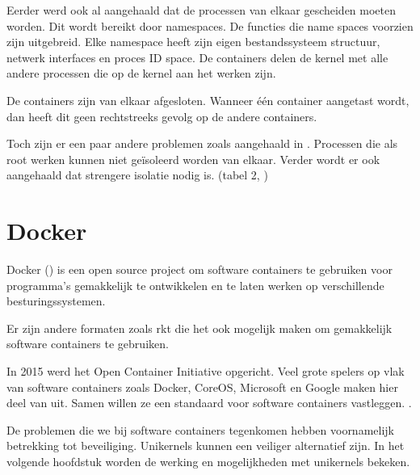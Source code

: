 Eerder werd ook al aangehaald dat de processen van elkaar gescheiden moeten worden. Dit wordt bereikt door namespaces. De functies die name spaces voorzien zijn uitgebreid. Elke namespace heeft zijn eigen bestandssysteem structuur, netwerk interfaces en proces ID space. De containers delen de kernel met alle andere processen die op de kernel aan het werken zijn.

De containers zijn van elkaar afgesloten. Wanneer één container aangetast wordt, dan heeft dit geen rechtstreeks gevolg op de andere containers.

Toch zijn er een paar andere problemen zoals aangehaald in \cite{madhavapeddy_jitsu:_2015}. Processen die als root werken kunnen niet geïsoleerd worden van elkaar. Verder wordt er ook aangehaald dat strengere isolatie nodig is. (tabel 2, \cite{madhavapeddy_jitsu:_2015})

\section{Docker}

Docker (\cite{docker_docker_2016}) is een open source project om software containers te gebruiken voor programma's gemakkelijk te ontwikkelen en te laten werken op verschillende besturingssystemen.

Er zijn andere formaten zoals rkt \cite{_rkt_????} die het ook mogelijk maken om gemakkelijk software containers te gebruiken.

In 2015 werd het Open Container Initiative opgericht. Veel grote spelers op vlak van software containers zoals Docker, CoreOS, Microsoft en Google maken hier deel van uit. Samen willen ze een standaard voor software containers vastleggen. \cite{}.

De problemen die we bij software containers tegenkomen hebben voornamelijk betrekking tot beveiliging. Unikernels kunnen een veiliger alternatief zijn. In het volgende hoofdstuk worden de werking en mogelijkheden met unikernels bekeken.
